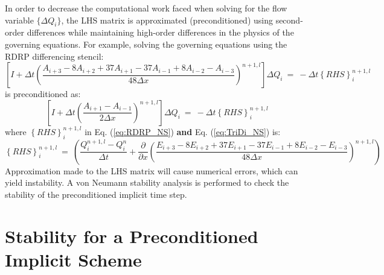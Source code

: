 \documentclass[conf]{new-aiaa}
\begin{document}
In order to decrease the computational work faced when solving for the flow variable $\{\Delta{Q}_i\}$, the LHS matrix is approximated (preconditioned) using second-order differences while maintaining high-order differences in the physics of the governing equations. For example, solving the governing equations using the RDRP differencing stencil:
\begin{equation}
	\label{eq:RDRP_NS}
  		\left[I+\Delta{t}\left(\frac{A_{i+3}-8A_{i+2}+37A_{i+1}-37A_{i-1}+8A_{i-2}-A_{i-3}}{48\Delta{x}}\right)^{n+1,l}\right]\Delta{Q}_i~=~-\Delta{t}\left\{RHS\right\}_i^{n+1, l}
\end{equation}
is preconditioned as:
\begin{equation}
	\label{eq:TriDi_NS}
  		\left[I+\Delta{t}\left(\frac{A_{i+1}-A_{i-1}}{2\Delta{x}}\right)^{n+1,l}\right]\Delta{Q}_i~=~-\Delta{t}\left\{RHS\right\}_i^{n+1, l}
\end{equation}
where $\left\{RHS\right\}_i^{n+1, l}$ in Eq. (\ref{eq:RDRP_NS}) \textbf{and} Eq. (\ref{eq:TriDi_NS}) is: 
\begin{equation*}
	\left\{RHS\right\}_i^{n+1, l}~=~\left(\frac{Q_i^{n+1, l}-Q_i^n}{\Delta{t}}+\frac{\partial}{\partial{x}}\left(\frac{E_{i+3}-8E_{i+2}+37E_{i+1}-37E_{i-1}+8E_{i-2}-E_{i-3}}{48\Delta{x}}\right)^{n+1,l}\right)
\end{equation*}
Approximation made to the LHS matrix will cause numerical errors, which can yield instability. A von Neumann stability analysis is performed to check the stability of the preconditioned implicit time step. 

\section{Stability for a Preconditioned Implicit Scheme}
\label{sec:Stability}
\end{document}
